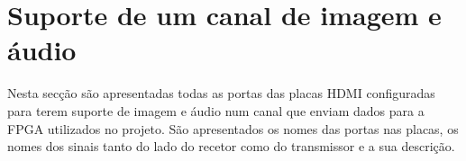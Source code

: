 
\section{Suporte de um canal de imagem e áudio} \label {ap1:HDMIconfig+audio}

Nesta secção são apresentadas todas as portas das placas HDMI configuradas para terem suporte de imagem e áudio num canal que enviam dados para a FPGA utilizados no projeto. São apresentados os nomes das portas nas placas, os nomes dos sinais tanto do lado do recetor como do transmissor e a sua descrição.

